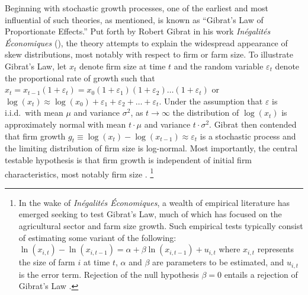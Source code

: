 \documentclass[english]{article}
\begin{document}
Beginning with stochastic growth processes, one of the earliest and most 
influential of such theories, as mentioned, is known as ``Gibrat's Law of 
Proportionate Effects.'' 
Put forth by Robert Gibrat in his work 
\emph{In\'{e}galit\'{e}s \'{E}conomiques} (\citeyear{gibrat1931}), 
the theory attempts to explain the widespread appearance of skew 
distributions, most notably with respect to firm or farm size.
To illustrate Gibrat's Law, let $x_t$ denote firm size at time $t$ and the 
random variable $\varepsilon_t$ denote the proportional rate of growth such 
that $x_t = x_{t-1}(1 + \varepsilon_t) = x_{0}(1 + \varepsilon_1)(1 + 
\varepsilon_2) \ldots (1 + \varepsilon_t)$ or $\log(x_t) \approx \log(x_{0}) 
+ \varepsilon_1 + \varepsilon_2 + \ldots + \varepsilon_t$. 
Under the assumption that $\varepsilon$ is i.i.d.\ with mean $\mu$ and 
variance $\sigma^2$, as $t \to \infty$ the distribution of $\log(x_t)$ is 
approximately normal with mean $t \cdot \mu $ and variance 
$t \cdot \sigma^2$. 
Gibrat then contended that firm growth $g_t \equiv \log(x_t) - \log(x_{t-1}) 
\approx \varepsilon_t$ is a stochastic process and the limiting distribution of 
firm size is log-normal.
Most importantly, the central testable hypothesis is that firm growth is 
independent of initial firm characteristics, most notably firm size 
\citep{sutton1997}.%
\footnote{In the wake of \emph{In\'{e}galit\'{e}s \'{E}conomiques}, 
a wealth of empirical literature has emerged seeking to test Gibrat's Law, 
much of which has focused on the agricultural sector and farm size growth. 
Such empirical tests typically consist of estimating some variant of the 
following: $\ln(x_{i,t}) - \ln(x_{i,t-1}) = \alpha + \beta \ln(x_{i,t-1}) + 
u_{i,t}$ where $x_{i,t}$ represents the size of farm $i$ at time $t$, $\alpha$ 
and $\beta$ are parameters to be estimated, and $u_{i,t}$ is the error term. 
Rejection of the null hypothesis $\beta=0$ entails a rejection of Gibrat's Law \citep{weiss1999}.} 
\end{document}
